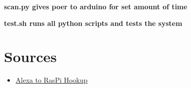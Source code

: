 \documentclass[notitlepage,11pt]{article}
\begin{document}
        \textbf{scan.py gives poer to arduino for set amount of time}

        \textbf{test.sh runs all python scripts and tests the system}

    \section{Sources}
    \begin{itemize}
        \item \href{https://github.com/n8henrie/fauxmo}{Alexa to RasPi Hookup}
    \end{itemize}
\end{document}
